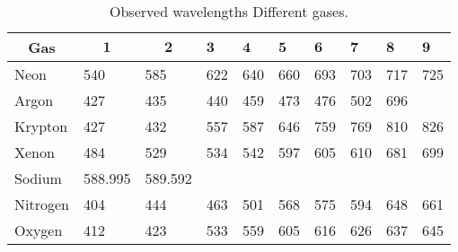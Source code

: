 \begin{table}
    \begin{adjustbox}{width=1\textwidth, center}
        \begin{tabular}{|l|l|l|l|l|l|l|l|l|l|}
            \hline \multicolumn{1}{|c|}{ Gas } & \multicolumn{1}{|c|}{$\mathbf{1}$} & \multicolumn{1}{c|}{$\mathbf{2}$} & $\mathbf{3}$ & $\mathbf{4}$ & $\mathbf{5}$ & $\mathbf{6}$ & $\mathbf{7}$ & $\mathbf{8}$ & $\mathbf{9}$ \\
            \hline Neon                        & 540                                & 585                               & 622          & 640          & 660          & 693          & 703          & 717          & 725          \\
            \hline Argon                       & 427                                & 435                               & 440          & 459          & 473          & 476          & 502          & 696          &              \\
            \hline Krypton                     & 427                                & 432                               & 557          & 587          & 646          & 759          & 769          & 810          & 826          \\
            \hline Xenon                       & 484                                & 529                               & 534          & 542          & 597          & 605          & 610          & 681          & 699          \\
            \hline Sodium                      & 588.995                            & 589.592                           &              &              &              &              &              &              &              \\
            \hline Nitrogen                    & 404                                & 444                               & 463          & 501          & 568          & 575          & 594          & 648          & 661          \\
            \hline Oxygen                      & 412                                & 423                               & 533          & 559          & 605          & 616          & 626          & 637          & 645          \\
            \hline
        \end{tabular}
    \end{adjustbox}
    \caption{Observed wavelengths Different gases.}
    \label{tab:differentGases}
\end{table}


